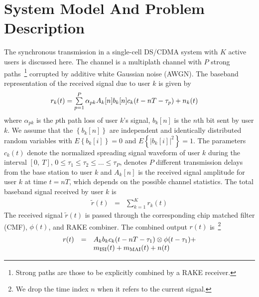 \documentclass[conference]{IEEEtran}
\begin{document}
\section{System Model And Problem Description}
The synchronous transmission in a single-cell DS/CDMA system with
$K$ active users is discussed here. The channel is a multiplath
channel with $P$ strong paths~\footnote{Strong paths are those to
be explicitly combined by a RAKE receiver.} corrupted by additive
white Gaussian noise (AWGN). The baseband representation of the
received signal due to user $k$ is given by
\begin{equation}
\begin{array}{l}\hspace{-0.2in}
r_k(t)=\sum\limits_{p=1}^{P}\alpha_{pk}A_k[n]
b_k[n]c_k(t-nT-\tau_p)+n_k(t)
\end{array}
\end{equation}
\noindent where $\alpha_{pk}$ is the $p$th path loss of user $k$'s
signal, $b_k{[n]}$ is the $n$th bit sent by user $k$. We assume
that the $\left\{b_k{[n]}\right\}$ are independent and identically
distributed random variables with $E\left\{b_k{[i]}\right\}=0$ and
$E\left\{|b_k{[i]}|^2\right\}=1$. The parameters $c_k(t)$ denote
the normalized spreading signal waveform of user $k$ during the
interval $[0,\ T]$, $0\leq\tau_1\leq\tau_2\leq\ldots\leq\tau_P$,
denotes $P$ different transmission delays from the base station to
user $k$ and $A_k[n]$ is the received signal amplitude for user
$k$ at time $t=nT$, which depends on the possible channel
statistics. The total baseband signal received by user $k$ is
\begin{equation}
\begin{array}{rcl}
\tilde{r}(t)&=&\sum\limits_{k=1}^{K}r_k(t)
\end{array}
\end{equation}
The received signal $\tilde{r}(t)$ is passed through the
corresponding chip matched filter (CMF), $\phi(t)$, and RAKE
combiner. The combined output $r(t)$ is~\footnote{We drop the time
index $n$ when it refers to the current signal.}
\begin{equation}%
\begin{array}{rcl}
r(t)&=&A_k b_k c_k(t-nT-\tau_1)\otimes \phi(t-\tau_1)+ \\
&&\hspace{0.0in} m_{\mbox{\rm\tiny ISI}}(t) + m_{\mbox{\rm\tiny
MAI}}(t) + n(t)
\end{array}\label{r_t}
\end{equation}
\end{document}

